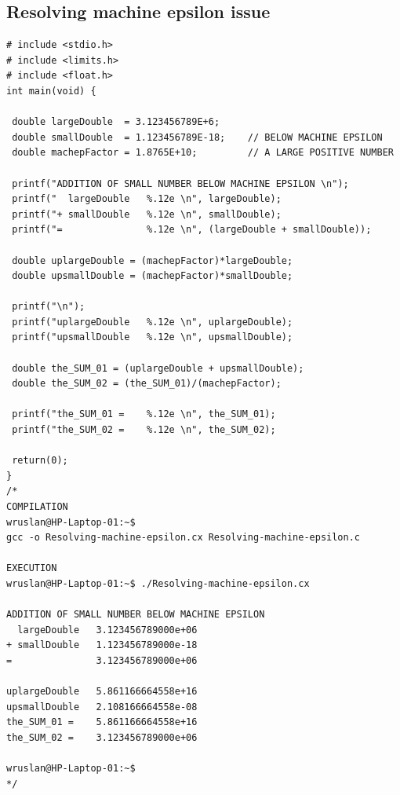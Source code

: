 \clearpage
\pagebreak

\subsection{Resolving machine epsilon issue}
\label{app4-Resolving machine epsilon issue}

\begin{lstlisting}[caption={Resolving machine epsilon issue}, label=lst-Resolving machine epsilon issue]	
# include <stdio.h>
# include <limits.h> 
# include <float.h>
int main(void) {
	
 double largeDouble  = 3.123456789E+6;
 double smallDouble  = 1.123456789E-18;    // BELOW MACHINE EPSILON 
 double machepFactor = 1.8765E+10;         // A LARGE POSITIVE NUMBER
	
 printf("ADDITION OF SMALL NUMBER BELOW MACHINE EPSILON \n");
 printf("  largeDouble   %.12e \n", largeDouble); 
 printf("+ smallDouble   %.12e \n", smallDouble);
 printf("=               %.12e \n", (largeDouble + smallDouble));
	
 double uplargeDouble = (machepFactor)*largeDouble;
 double upsmallDouble = (machepFactor)*smallDouble;
	
 printf("\n");
 printf("uplargeDouble   %.12e \n", uplargeDouble);    
 printf("upsmallDouble   %.12e \n", upsmallDouble);    
	
 double the_SUM_01 = (uplargeDouble + upsmallDouble);
 double the_SUM_02 = (the_SUM_01)/(machepFactor);
	
 printf("the_SUM_01 =    %.12e \n", the_SUM_01);      
 printf("the_SUM_02 =    %.12e \n", the_SUM_02); 
	
 return(0);
}
/*
COMPILATION
wruslan@HP-Laptop-01:~$ 
gcc -o Resolving-machine-epsilon.cx Resolving-machine-epsilon.c 

EXECUTION
wruslan@HP-Laptop-01:~$ ./Resolving-machine-epsilon.cx 

ADDITION OF SMALL NUMBER BELOW MACHINE EPSILON 
  largeDouble   3.123456789000e+06 
+ smallDouble   1.123456789000e-18 
=               3.123456789000e+06 

uplargeDouble   5.861166664558e+16 
upsmallDouble   2.108166664558e-08 
the_SUM_01 =    5.861166664558e+16 
the_SUM_02 =    3.123456789000e+06 

wruslan@HP-Laptop-01:~$ 
*/
\end{lstlisting}




